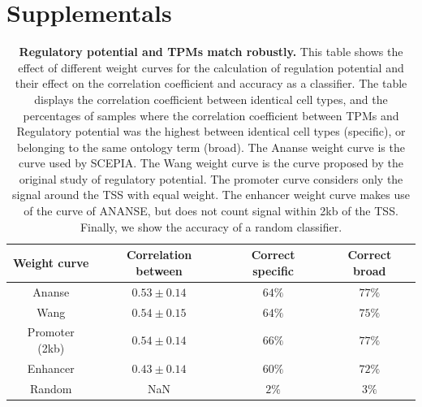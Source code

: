 \section{Supplementals}
\beginsupplement
\begin{table}
    \begin{center}
        \begin{tabular}{||c c c c||} 
        \hline
        Weight curve & Correlation between & Correct specific & Correct broad \\[0.5ex] 
        \hline
        Ananse\cite{Xu_2020}& $0.53 \pm 0.14$ & $64\%$ & $77\%$ \\ 
        \hline
        Wang\cite{Wang2016} & $0.54 \pm 0.15 $ & $64\%$ & $75\%$ \\
        \hline
        Promoter (2kb) & $0.54 \pm 0.14$ & $66\%$ & $77\%$ \\
        \hline
        Enhancer & $0.43 \pm 0.14$ & $60\%$ & $72\%$ \\
        \hline
        Random & NaN & $2\%$ & $3\%$ \\
        \hline
        \end{tabular}
        \caption{\textbf{Regulatory potential and TPMs match robustly.} This table shows the effect of different weight curves for the calculation of regulation potential and their effect on the correlation coefficient and accuracy as a classifier. The table displays the correlation coefficient between identical cell types, and the percentages of samples where the correlation coefficient between TPMs and Regulatory potential was the highest between identical cell types (specific), or belonging to the same ontology term (broad). The Ananse weight curve is the curve used by SCEPIA. The Wang weight curve is the curve proposed by the original study of regulatory potential. The promoter curve considers only the signal around the TSS with equal weight. The enhancer weight curve makes use of the curve of ANANSE, but does not count signal within 2kb of the TSS. Finally, we show the accuracy of a random classifier.}
        \label{table:correlations}
    \end{center}
\end{table}

